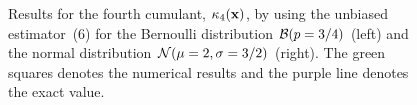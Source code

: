 \documentclass[a4paper]{article}
\begin{document}
\begin{figure}
  \begin{center}
  \end{center}
  \caption{Results for the fourth cumulant, $\kappa_4({\bf x})$, by using the unbiased estimator~(6) for the Bernoulli distribution ${\cal B}(p=3/4)$ (left) and the normal distribution ${\cal N}(\mu=2,\sigma=3/2)$ (right). The green squares denotes the numerical results and the purple line denotes the exact value.}
\end{figure}
\end{document}
